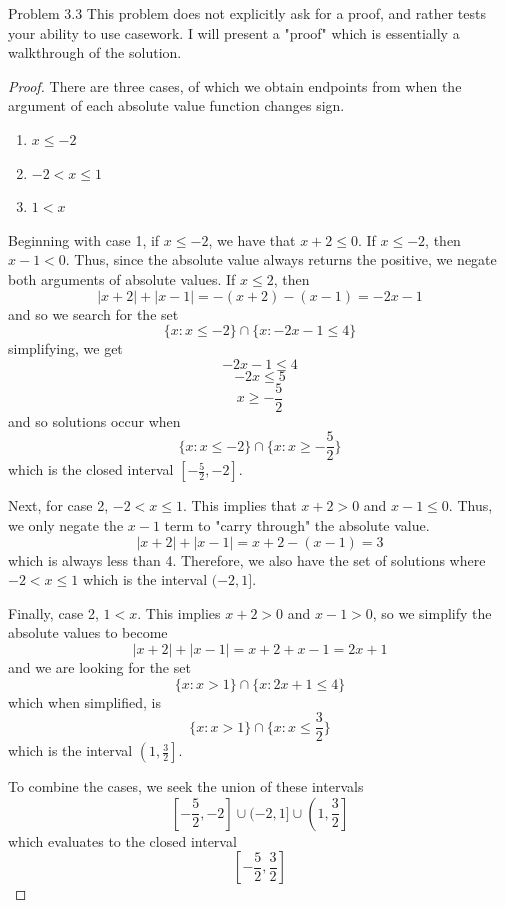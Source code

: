 \begin{sol}{Problem 3.3}
This problem does not explicitly ask for a proof, and rather tests your ability to use casework. I will present a "proof" which is essentially a walkthrough of the solution.
\begin{proof}
There are three cases, of which we obtain endpoints from when the argument of each absolute value function changes sign. 
\begin{enumerate}
    \item $x \leq -2$
    \item $-2 < x \leq 1$
    \item $1 < x$
\end{enumerate}
Beginning with case 1, if $x \leq -2$, we have that $x + 2 \leq 0$. If $x \leq -2$, then $x - 1 < 0$. Thus, since the absolute value always returns the positive, we negate both arguments of absolute values. If $x \leq 2$, then 
\[
|x + 2| + |x-1| = -(x+2) -(x-1) = -2x -1
\]
and so we search for the set 
\[
\{x : x \leq -2\} \cap\{x : -2x-1 \leq 4 \}
\]
simplifying, we get 
\[
-2x-1 \leq 4
\]
\[
-2x \leq 5
\]
\[
x \geq -\frac{5}{2}
\]
and so solutions occur when 
\[
\{x : x \leq -2\} \cap\{x : x \geq -\frac{5}{2} \}
\]
which is the closed interval $\left[-\frac{5}{2}, -2\right]$.

Next, for case 2, $-2 < x \leq 1$. This implies that $x + 2 > 0$ and $x - 1 \leq 0$. Thus, we only negate the $x - 1$ term to "carry through" the absolute value.
\[
|x + 2| + |x-1| = x + 2 -(x-1) = 3
\]
which is always less than 4. Therefore, we also have the set of solutions where $-2 < x \leq 1$ which is the interval $(-2, 1]$.

Finally, case 2, $1 < x$. This implies $x + 2 > 0$ and $x - 1 > 0$, so we simplify the absolute values to become
\[
|x + 2| + |x-1|  = x + 2 + x - 1 = 2x + 1
\]
and we are looking for the set
\[
\{x : x > 1\} \cap\{x : 2x+1 \leq 4 \}
\]
which when simplified, is 
\[
\{x : x > 1\} \cap\{x :  x \leq \frac{3}{2}\}
\]
which is the interval $\left(1, \frac{3}{2}\right]$. 

To combine the cases, we seek the union of these intervals
\[
\left[-\frac{5}{2}, -2\right] \cup (-2, 1] \cup \left(1, \frac{3}{2}\right]
\]
which evaluates to the closed interval
\[
\boxed{\left[-\frac{5}{2}, \frac{3}{2}\right]}
\]
\end{proof}
\end{sol}


